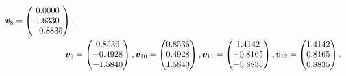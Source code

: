 \documentclass{article}
\begin{document}
\begin{itemize}
\begin{align*}
   \bm{v}_8 = \begin{pmatrix} 0.0000\\    1.6330\\   -0.8835 \end{pmatrix}, \\ 
   \bm{v}_9 &= \begin{pmatrix}0.8536\\   -0.4928\\   -1.5840 \end{pmatrix}, 
   \bm{v}_{10} = \begin{pmatrix} 0.8536\\    0.4928\\    1.5840 \end{pmatrix}, 
   \bm{v}_{11} = \begin{pmatrix} 1.4142\\   -0.8165\\   -0.8835 \end{pmatrix}, 
   \bm{v}_{12} = \begin{pmatrix} 1.4142\\    0.8165\\    0.8835 \end{pmatrix}.
 \end{align*}
\end{itemize}
\end{document}
